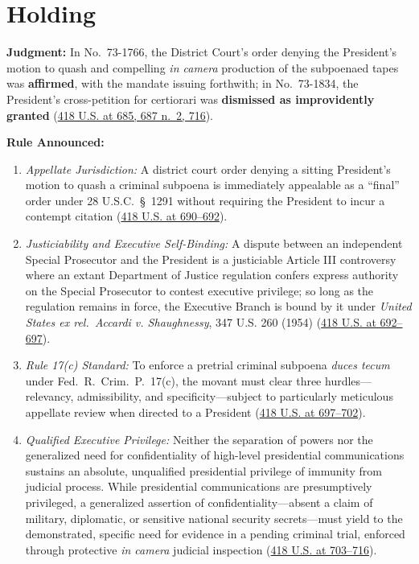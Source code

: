 \documentclass[12pt]{article}
\begin{document}
\section{Holding}

\textbf{Judgment:} In No.\ 73-1766, the District Court's order denying the President's motion to quash and compelling \textit{in camera} production of the subpoenaed tapes was \textbf{affirmed}, with the mandate issuing forthwith; in No.\ 73-1834, the President's cross-petition for certiorari was \textbf{dismissed as improvidently granted} (\href{https://supreme.justia.com/cases/federal/us/418/683/}{418 U.S. at 685, 687 n.\ 2, 716}).

\textbf{Rule Announced:}
\begin{enumerate}
\item \textit{Appellate Jurisdiction:} A district court order denying a sitting President's motion to quash a criminal subpoena is immediately appealable as a ``final'' order under 28 U.S.C.\ \S\ 1291 without requiring the President to incur a contempt citation (\href{https://supreme.justia.com/cases/federal/us/418/683/}{418 U.S. at 690--692}).
\item \textit{Justiciability and Executive Self-Binding:} A dispute between an independent Special Prosecutor and the President is a justiciable Article III controversy where an extant Department of Justice regulation confers express authority on the Special Prosecutor to contest executive privilege; so long as the regulation remains in force, the Executive Branch is bound by it under \textit{United States ex rel.\ Accardi v. Shaughnessy}, 347 U.S. 260 (1954) (\href{https://supreme.justia.com/cases/federal/us/418/683/}{418 U.S. at 692--697}).
\item \textit{Rule 17(c) Standard:} To enforce a pretrial criminal subpoena \textit{duces tecum} under Fed.\ R.\ Crim.\ P.\ 17(c), the movant must clear three hurdles---relevancy, admissibility, and specificity---subject to particularly meticulous appellate review when directed to a President (\href{https://supreme.justia.com/cases/federal/us/418/683/}{418 U.S. at 697--702}).
\item \textit{Qualified Executive Privilege:} Neither the separation of powers nor the generalized need for confidentiality of high-level presidential communications sustains an absolute, unqualified presidential privilege of immunity from judicial process. While presidential communications are presumptively privileged, a generalized assertion of confidentiality---absent a claim of military, diplomatic, or sensitive national security secrets---must yield to the demonstrated, specific need for evidence in a pending criminal trial, enforced through protective \textit{in camera} judicial inspection (\href{https://supreme.justia.com/cases/federal/us/418/683/}{418 U.S. at 703--716}).
\end{enumerate}
\end{document}
